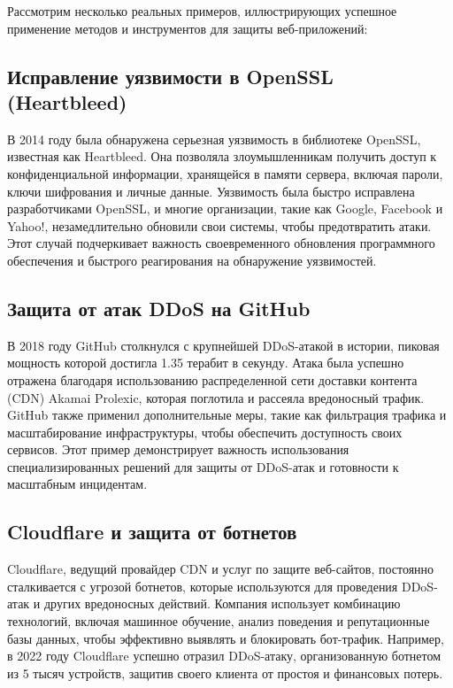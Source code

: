 \documentclass[a4paper,12pt]{diplom}
\begin{document}
	 Рассмотрим несколько реальных примеров, иллюстрирующих успешное применение методов и инструментов для защиты веб-приложений:
	 
	 \subsection{Исправление уязвимости в OpenSSL (Heartbleed)}
	 
	 В 2014 году была обнаружена серьезная уязвимость в библиотеке OpenSSL, известная как Heartbleed.  Она позволяла злоумышленникам получить доступ к конфиденциальной информации, хранящейся в памяти сервера, включая пароли, ключи шифрования и личные данные.  Уязвимость была быстро исправлена разработчиками OpenSSL, и многие организации, такие как Google, Facebook и Yahoo!, незамедлительно обновили свои системы, чтобы предотвратить атаки.  Этот случай подчеркивает важность своевременного обновления программного обеспечения и быстрого реагирования на обнаружение уязвимостей.\cite{OpenSSL_anti_attack}
	 
	 \subsection{Защита от атак DDoS на GitHub}
	 
	 В 2018 году GitHub столкнулся с крупнейшей DDoS-атакой в истории, пиковая мощность которой достигла 1.35 терабит в секунду.  Атака была успешно отражена благодаря использованию распределенной сети доставки контента (CDN) Akamai Prolexic, которая поглотила и рассеяла вредоносный трафик.  GitHub также применил дополнительные меры, такие как фильтрация трафика и масштабирование инфраструктуры, чтобы обеспечить доступность своих сервисов.  Этот пример демонстрирует важность использования специализированных решений для защиты от DDoS-атак и готовности к масштабным инцидентам.\cite{Github_anti_attack}
	 
	 \subsection{Cloudflare и защита от ботнетов}
	 
	 Cloudflare, ведущий провайдер CDN и услуг по защите веб-сайтов, постоянно сталкивается с угрозой ботнетов, которые используются для проведения DDoS-атак и других вредоносных действий.  Компания использует комбинацию технологий, включая машинное обучение, анализ поведения и репутационные базы данных, чтобы эффективно выявлять и блокировать бот-трафик.\cite{Cloudflare_anti_attack_1}  Например, в 2022 году Cloudflare успешно отразил DDoS-атаку, организованную ботнетом из 5 тысяч устройств, защитив своего клиента от простоя и финансовых потерь.\cite{Cloudflare_anti_attack_2}
	 
\end{document}
